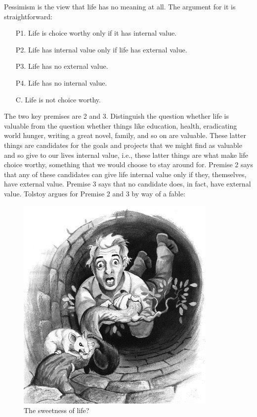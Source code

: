 \documentclass[10pt]{article}
\providecommand{\tightlist}{%
  \setlength{\itemsep}{0pt}\setlength{\parskip}{0pt}}
\begin{document}
Pessimism is the view that life has no meaning at all. The argument for
it is straightforward:

\begin{enumerate}
\def\labelenumi{\arabic{enumi}.}
\tightlist
\item[P1.]
  Life is choice worthy only if it has internal value.
\item[P2.]
  Life has internal value only if life has external value.
\item[P3.]
  Life has no external value.
\item[P4.]
  Life has no internal value. 
  \item[C.] Life is not choice worthy.
\end{enumerate}

The two key premises are 2 and 3. Distinguish the question whether life
is valuable from the question whether things like education, health,
eradicating world hunger, writing a great novel, family, and so on are
valuable. These latter things are candidates for the goals and projects
that we might find as valuable and so give to our lives internal value,
i.e., these latter things are what make life choice worthy, something
that we would choose to stay around for. Premise 2 says that any of
these candidates can give life internal value only if they, themselves,
have external value. Premise 3 says that no candidate does, in fact,
have external value. Tolstoy argues for Premise 2 and 3 by way of a
fable:

\begin{figure}[htbp]
\centering
\includegraphics{Tolstoy.jpg}
\caption{The sweetness of life?}
\end{figure}
\end{document}

